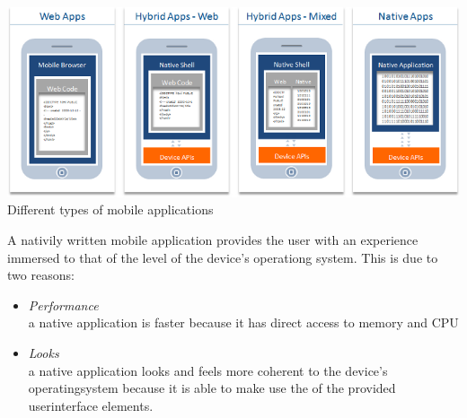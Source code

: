 \begin{centering}
\includegraphics[scale=0.5]{images/apptypesdefined.png}\\{Different types of mobile applications\cite{IBM-Worklight2012}}\\
\end{centering}

A nativily written mobile application provides the user with an experience immersed to that of the level of the device's operationg system. This is due to two reasons:
\begin{itemize}
\item
\emph{Performance}\\
a native application is faster because it has direct access to memory and CPU
\item \emph{Looks}\\
a native application looks and feels more coherent to the device's operatingsystem because it is able to make use the of the provided userinterface elements.
\end{itemize}


